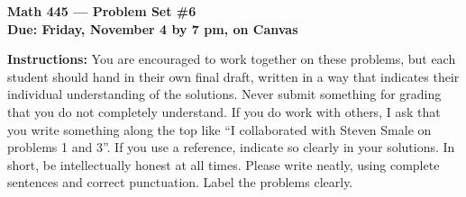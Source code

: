\documentclass{amsart}
\begin{document}
\begin{center}
{\large\bfseries
Math 445 --- Problem Set \#6 \\
Due: Friday, November 4 by 7 pm, on Canvas}
\end{center}





{\bf Instructions:} You are encouraged to work together on these
problems, but each student should hand in their own final draft,
written in a way that indicates their individual understanding of
the solutions. Never submit something for grading
that you do not completely understand. If you do work with others, I ask that you write something along the
top like ``I collaborated with Steven Smale on problems 1 and 3''.
If you use a reference, indicate so clearly in your solutions. 
In short, be intellectually
honest at all times. Please write neatly, using complete sentences and correct
punctuation. Label the problems clearly. 
\end{document}
